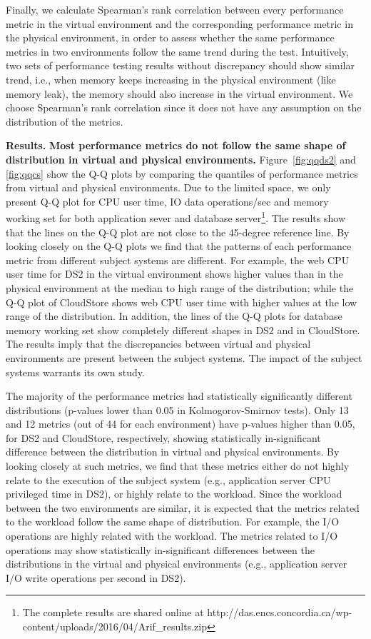 \documentclass[smallextended]{svjour3}       %
\begin{document}
Finally, we calculate Spearman's rank correlation between every performance metric in the virtual environment and the corresponding performance metric in the physical environment, in order to assess whether the same performance metrics in two environments follow the same trend during the test. Intuitively, two sets of performance testing results without discrepancy should show similar trend, i.e., when memory keeps increasing in the physical environment (like memory leak), the memory should also increase in the virtual environment. We choose Spearman's rank correlation since it does not have any assumption on the distribution of the metrics. 

\noindent \textbf{Results.}
\textbf{Most performance metrics do not follow the same shape of distribution in virtual and physical environments.} Figure~\ref{fig:qqds2} and \ref{fig:qqcs} show the Q-Q plots by comparing the quantiles of performance metrics from virtual and physical environments. Due to the limited space, we only present Q-Q plot for CPU user time, IO data operations/sec and memory working set for both application sever and database server\footnote{The complete results are shared online at http://das.encs.concordia.ca/wp-content/uploads/2016/04/Arif\_results.zip}. The results show that the lines on the Q-Q plot are not close to the 45-degree reference line. By looking closely on the Q-Q plots we find that the patterns of each performance metric from different subject systems are different. For example, the web CPU user time for DS2 in the virtual environment shows higher values than in the physical environment at the median to high range of the distribution; while the Q-Q plot of CloudStore shows web CPU user time with higher values at the low range of the distribution. In addition, the lines of the Q-Q plots for database memory working set show completely different shapes in DS2 and in CloudStore. The results imply that the discrepancies between virtual and physical environments are present between the subject systems. The impact of the subject systems warrants its own study.

The majority of the performance metrics had statistically significantly different distributions (p-values lower than 0.05 in Kolmogorov-Smirnov tests). Only 13 and 12 metrics (out of 44 for each environment) have p-values higher than 0.05, for DS2 and CloudStore, respectively, showing statistically in-significant difference between the distribution in virtual and physical environments. By looking closely at such metrics, we find that these metrics either do not highly relate to the execution of the subject system (e.g., application server CPU privileged time in DS2), or highly relate to the workload. Since the workload between the two environments are similar, it is expected that the metrics related to the workload follow the same shape of distribution. For example, the I/O operations are highly related with the workload. The metrics related to I/O operations may show statistically in-significant differences between the distributions in the virtual and physical environments (e.g., application server I/O write operations per second in DS2). %
\end{document}
